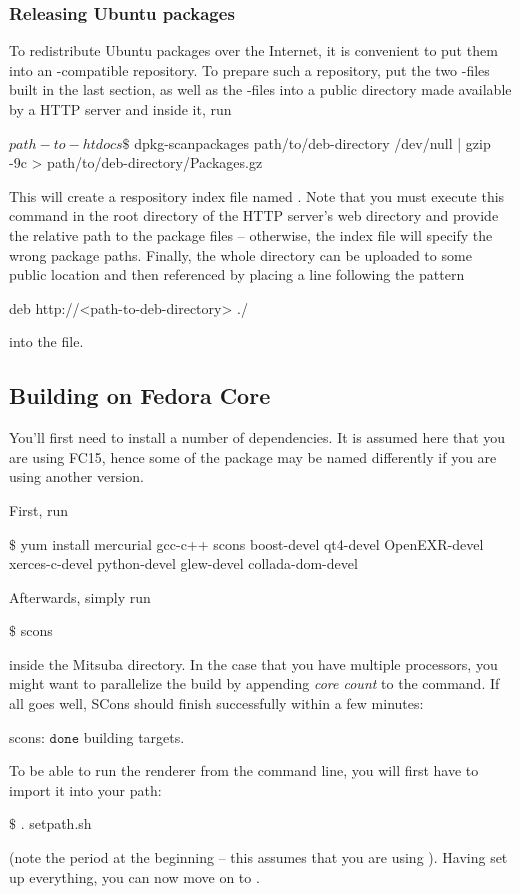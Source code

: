 \subsubsection{Releasing Ubuntu packages}
To redistribute Ubuntu packages over the Internet, it is convenient to 
put them into an -compatible repository. To prepare such a
repository, put the two -files built in the last section, 
as well as the  -files into a public directory 
made available by a HTTP server and inside it, run
\begin{shell}
$path-to-htdocs\text{\$}$ dpkg-scanpackages path/to/deb-directory /dev/null | gzip -9c > path/to/deb-directory/Packages.gz
\end{shell}
This will create a respository index file named .
Note that you must execute this command in the root directory of the
HTTP server's web directory and provide the relative path to the 
package files -- otherwise, the index file will specify the wrong package 
paths. Finally, the whole directory can be uploaded to some public location
and then referenced by placing a line following the pattern
\begin{shell}
deb http://<path-to-deb-directory> ./
\end{shell}
into the  file.

\subsection{Building on Fedora Core}
You'll first need to install a number of dependencies. It is assumed here
that you are using FC15, hence some of the package may be named differently if you are 
using another version.

First, run
\begin{shell}
$\text{\$}$ yum install mercurial gcc-c++ scons boost-devel qt4-devel OpenEXR-devel xerces-c-devel python-devel glew-devel collada-dom-devel
\end{shell}
Afterwards, simply run
\begin{shell}
$\text{\$}$ scons
\end{shell}
inside the Mitsuba directory. In the case that you have multiple processors, you might want to parallelize the build by appending \emph{core count} to the command.
If all goes well, SCons should finish successfully within a few minutes:
\begin{shell}
scons: $\texttt{done}$ building targets.
\end{shell}
To be able to run the renderer from the command line, you will first have to import it into your path:
\begin{shell}
$\text{\$}$ . setpath.sh
\end{shell}
(note the period at the beginning -- this assumes that you are using ).
Having set up everything, you can now move on to .
